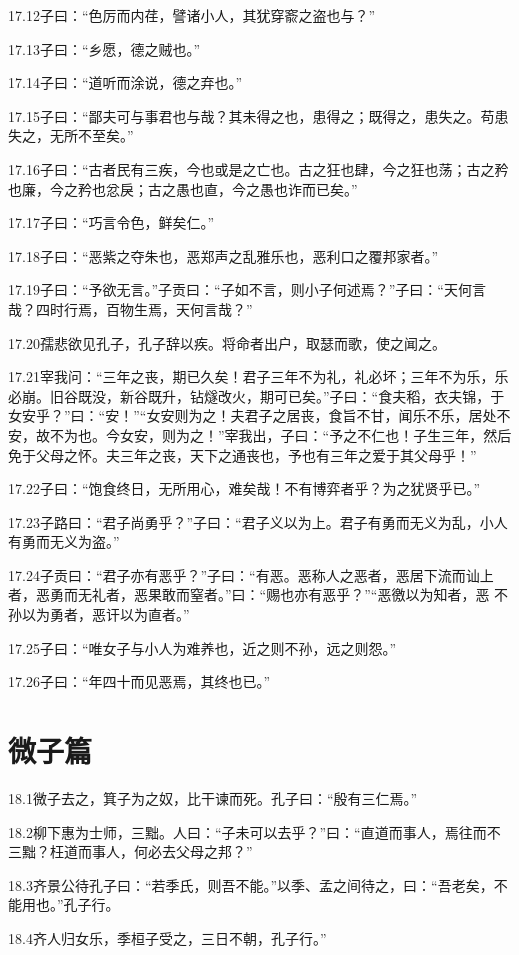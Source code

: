 \documentclass[a4paper,12pt,UTF8,twoside]{ctexbook}
\begin{document}
17.12子曰：“色厉而内荏，譬诸小人，其犹穿窬之盗也与？”

17.13子曰：“乡愿，德之贼也。”

17.14子曰：“道听而涂说，德之弃也。”

17.15子曰：“鄙夫可与事君也与哉？其未得之也，患得之；既得之，患失之。苟患失之，无所不至矣。”

17.16子曰：“古者民有三疾，今也或是之亡也。古之狂也肆，今之狂也荡；古之矜也廉，今之矜也忿戾；古之愚也直，今之愚也诈而已矣。”

17.17子曰：“巧言令色，鲜矣仁。”

17.18子曰：“恶紫之夺朱也，恶郑声之乱雅乐也，恶利口之覆邦家者。”

17.19子曰：“予欲无言。”子贡曰：“子如不言，则小子何述焉？”子曰：“天何言哉？四时行焉，百物生焉，天何言哉？”

17.20孺悲欲见孔子，孔子辞以疾。将命者出户，取瑟而歌，使之闻之。

17.21宰我问：“三年之丧，期已久矣！君子三年不为礼，礼必坏；三年不为乐，乐必崩。旧谷既没，新谷既升，钻燧改火，期可已矣。”子曰：“食夫稻，衣夫锦，于女安乎？”曰：“安！”“女安则为之！夫君子之居丧，食旨不甘，闻乐不乐，居处不安，故不为也。今女安，则为之！”宰我出，子曰：“予之不仁也！子生三年，然后免于父母之怀。夫三年之丧，天下之通丧也，予也有三年之爱于其父母乎！”

17.22子曰：“饱食终日，无所用心，难矣哉！不有博弈者乎？为之犹贤乎已。”

17.23子路曰：“君子尚勇乎？”子曰：“君子义以为上。君子有勇而无义为乱，小人有勇而无义为盗。”

17.24子贡曰：“君子亦有恶乎？”子曰：“有恶。恶称人之恶者，恶居下流而讪上者，恶勇而无礼者，恶果敢而窒者。”曰：“赐也亦有恶乎？”“恶徼以为知者，恶
不孙以为勇者，恶讦以为直者。”

17.25子曰：“唯女子与小人为难养也，近之则不孙，远之则怨。”

17.26子曰：“年四十而见恶焉，其终也已。”

\chapter{微子篇}
18.1微子去之，箕子为之奴，比干谏而死。孔子曰：“殷有三仁焉。”

18.2柳下惠为士师，三黜。人曰：“子未可以去乎？”曰：“直道而事人，焉往而不三黜？枉道而事人，何必去父母之邦？”

18.3齐景公待孔子曰：“若季氏，则吾不能。”以季、孟之间待之，曰：“吾老矣，不能用也。”孔子行。

18.4齐人归女乐，季桓子受之，三日不朝，孔子行。”
\end{document}
